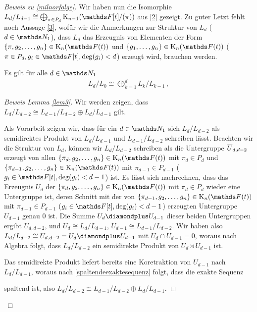 \documentclass[ngerman,fontsize=11pt, paper=a4, parskip=half, titlepage=true, toc=bib]{scrartcl}
\begin{document}
\begin{proof}[Beweis zu \ref{milnorfolge}]
  Wir haben nun die Isomorphie $L_d/L_{d-1}\cong \bigoplus_{\pi\in
    P_d}\K_{n-1}(\Ftpi)$ aus \ref{2} gezeigt.
  Zu guter Letzt fehlt noch Aussage \ref{3}, wofür wir die Anmerkungen
  zur Struktur von $L_d$ ($d\in\N_1$), dass $L_d$ das Erzeugnis von
  Elementen der Form
  $\{\pi,g_2,\dotsc,g_n\}\in\KnFt$ und $\{g_1,\dotsc,g_n\}\in\KnFt$
  ($\pi\in P_d,g_i\in\F[t],\deg(g_i)<d$)
  erzeugt wird,
  brauchen werden.

  \begin{Lem}\label{lem3}
    Es gilt für alle $d\in\N_1$
    \begin{gather} \label{3}
      L_d/L_0\cong \bigoplus_{k=1}^d L_k/L_{k-1} \,,
    \end{gather}
  \end{Lem}
  \begin{proof}[Beweis Lemma \ref{lem3}]
    Wir werden zeigen, dass $L_d/L_{d-2}\cong L_{d-1}/L_{d-2}\oplus
    L_{d}/L_{d-1}$ gilt.
    
    Als Vorarbeit zeigen wir, dass für ein $d\in\N_1$ sich
    $L_d/L_{d-2}$ als semidirektes Produkt von $L_d/L_{d-1}$ und
    $L_{d-1}/L_{d-2}$ schreiben lässt.
    Beachten wir die Struktur von $L_d$, können wir $L_d/L_{d-2}$
    schreiben als die Untergruppe $\overline U_{d,{d-2}}$ erzeugt von allen
    $\{\pi_d,g_2,\dotsc,g_n\}\in\KnFt$ mit $\pi_{d}\in P_d $
    und 
    $\{\pi_{d-1},g_2,\dotsc,g_n\}\in\KnFt$ mit $\pi_{d-1}\in P_{d-1}$
    ($g_i\in\F[t],\deg(g_i)<d-1$)
    ist.
    Es lässt sich nachrechnen, dass das Erzeugnis $U_d$ der 
    $\{\pi_d,g_2,\dotsc,g_n\}\in\KnFt$ mit $\pi_{d}\in P_d $
    wieder eine Untergruppe ist, deren Schnitt mit der von
    $\{\pi_{d-1},g_2,\dotsc,g_n\}\in\KnFt$ mit $\pi_{d-1}\in P_{d-1}$
    ($g_i\in\F[t],\deg(g_i)<d-1$)
    erzeugten Untergruppe $U_{d-1}$ genau $0$ ist.
    Die Summe $U_d\p U_{d-1}$ dieser beiden Untergruppen ergibt
    $U_{d,d-2}$,
    und $U_d\cong L_d/L_{d-1}$, $U_{d-1}\cong L_{d-1}/L_{d-2}$.
    Wir haben also $L_d/L_{d-2}\cong U_{d,d-2}=U_{d}\p U_{d-1}$ mit
    $U_d\cap U_{d-1}=0$, woraus nach Algebra folgt, dass
    $L_d/L_{d-2}$ ein semidirekte Produkt von $U_d\rtimes U_{d-1}$
    ist.

    Das semidirekte Produkt liefert bereits eine Koretraktion von
    $U_{d-1}$ nach $L_d/L_{d-1}$, woraus nach \ref{spaltendeexaktesequenz}
    folgt, dass die exakte Sequenz
    \begin{center}
    \end{center}
    spaltend ist, also $L_d/L_{d-2}\cong L_{d-1}/L_{d-2}\oplus
    L_d/L_{d-1}$.
    

\end{proof}
\end{proof}
\end{document}

